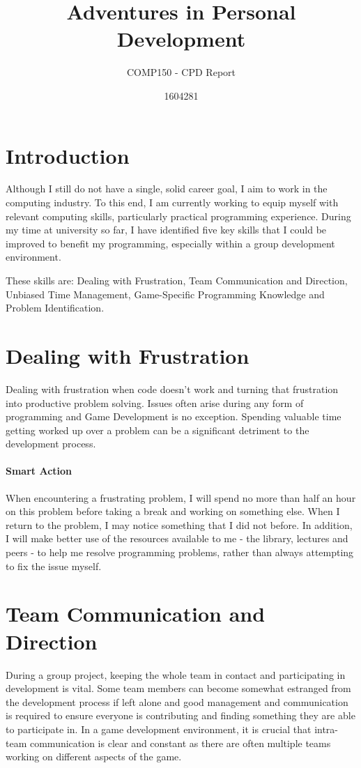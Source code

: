 \documentclass{scrartcl}
\title{Adventures in Personal Development}
\subtitle{COMP150 - CPD Report}
\author{1604281}
\begin{document}
\maketitle

\section{Introduction}

Although I still do not have a single, solid career goal, I aim to work in the computing industry. To this end, I am currently working to equip myself with relevant computing skills, particularly practical programming experience. During my time at university so far, I have identified five key skills that I could be improved to benefit my programming, especially within a group development environment.

These skills are: Dealing with Frustration, Team Communication and Direction, Unbiased Time Management, Game-Specific Programming Knowledge and Problem Identification.

\section{Dealing with Frustration}

Dealing with frustration when code doesn't work and turning that frustration into productive problem solving. Issues often arise during any form of programming and Game Development is no exception. Spending valuable time getting worked up over a problem can be a significant detriment to the development process.

\paragraph{Smart Action} When encountering a frustrating problem, I will spend no more than half an hour on this problem before taking a break and working on something else. When I return to the problem, I may notice something that I did not before. In addition, I will make better use of the resources available to me - the library, lectures and peers - to help me resolve programming problems, rather than always attempting to fix the issue myself.


\section{Team Communication and Direction}

During a group project, keeping the whole team in contact and participating in development is vital. Some team members can become somewhat estranged from the development process if left alone and good management and communication is required to ensure everyone is contributing and finding something they are able to participate in. In a game development environment, it is crucial that intra-team communication is clear and constant as there are often multiple teams working on different aspects of the game. 
\end{document}
